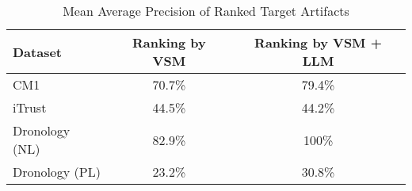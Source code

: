 \begin{table}[b]
    \centering
    \caption{Mean Average Precision of  Ranked Target Artifacts }
    \begin{tabular}{lcc}
        \toprule
        \textbf{Dataset} & \textbf{Ranking by VSM} & \textbf{Ranking by VSM + LLM} \\
        \midrule
        CM1 & 70.7\% & 79.4\% \\
        iTrust & 44.5\% & 44.2\% \\
        Dronology (NL) & 82.9\% & 100\% \\
        Dronology (PL) & 23.2\% & 30.8\% \\
        \bottomrule
    \end{tabular}
    \label{tab:performance_metrics}
\end{table}